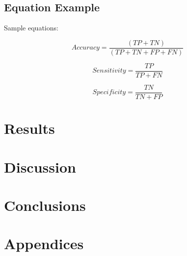 \documentclass[12pt]{article}
\begin{document}
\subsection{Equation Example}
Sample equations:

\begin{equation}
Accuracy = \frac{(TP + TN)}{(TP + TN + FP + FN)}
\end{equation}


\begin{equation}
Sensitivity = \frac{TP}{TP + FN}
\end{equation}

\begin{equation}
Specificity = \frac{TN}{TN + FP}
\end{equation}

\pagebreak



\section{Results}


\pagebreak





\section{Discussion}
\pagebreak


\section{Conclusions}
\pagebreak


\section{Appendices}
\pagebreak


\printbibliography
\end{document}
